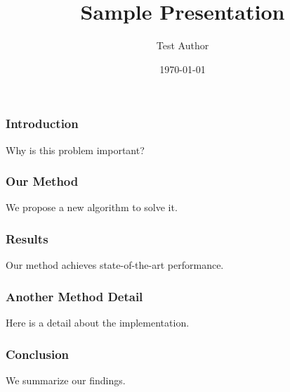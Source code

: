 \documentclass{beamer}
\title{Sample Presentation}
\author{Test Author}
\date{\today}
\begin{document}
\begin{frame}
\frametitle{Introduction}
Why is this problem important?
\end{frame}

\begin{frame}
\frametitle{Our Method}
We propose a new algorithm to solve it.
\end{frame}

\begin{frame}
\frametitle{Results}
Our method achieves state-of-the-art performance.
\end{frame}

\begin{frame}
\frametitle{Another Method Detail}
Here is a detail about the implementation.
\end{frame}

\begin{frame}
\frametitle{Conclusion}
We summarize our findings.
\end{frame}
\end{document}
